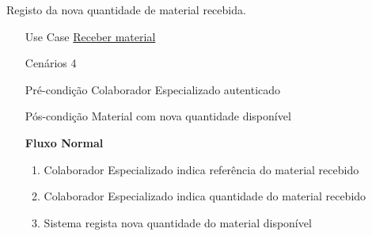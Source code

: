 \documentclass[../relatorio.tex]{subfiles}
\begin{document}
Registo da nova quantidade de material recebida.
\begin{itemize}
    \item[Use Case] {\underline{Receber material}}
    \item[Cenários] {4}
    \item[Pré-condição] {Colaborador Especializado autenticado}
    \item[Pós-condição] {Material com nova quantidade disponível}
          \begin{flushleft}
              \textbf{Fluxo Normal}
          \end{flushleft}
          \begin{enumerate}
              \item Colaborador Especializado indica referência do material recebido
              \item Colaborador Especializado indica quantidade do material recebido
              \item Sistema regista nova quantidade do material disponível
          \end{enumerate}
\end{itemize}
\end{document}
